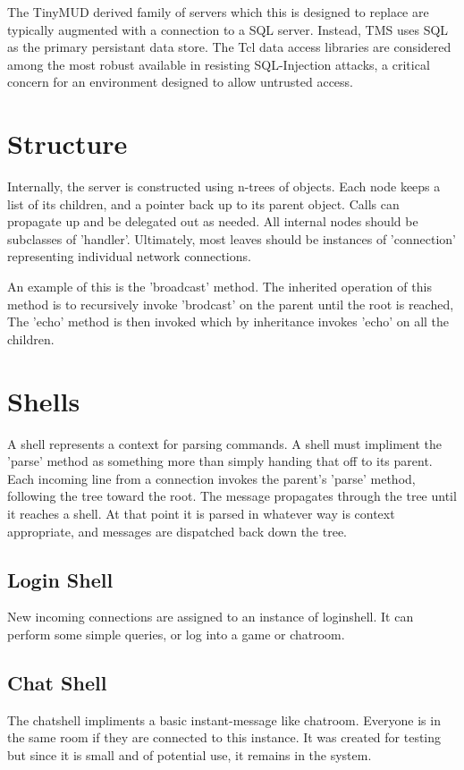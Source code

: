 \documentclass[10pt,letterpaper,twoside]{book}
\begin{document}
The TinyMUD derived family of servers which this is designed to replace are typically augmented with a connection to a SQL server.
Instead, TMS uses SQL as the primary persistant data store.
The Tcl data access libraries are considered among the most robust available in resisting SQL-Injection attacks,
a critical concern for an environment designed to allow untrusted access.
\chapter{Structure}
Internally, the server is constructed using n-trees of objects.
Each node keeps a list of its children, and a pointer back up to its parent object.
Calls can propagate up and be delegated out as needed.
All internal nodes should be subclasses of 'handler'.
Ultimately, most leaves should be instances of 'connection' representing individual network connections.

An example of this is the 'broadcast' method.
The inherited operation of this method is to recursively invoke 'brodcast' on the parent until the root is reached,
The 'echo' method is then invoked which by inheritance invokes 'echo' on all the children.
\chapter{Shells}
A shell represents a context for parsing commands.
A shell must impliment the 'parse' method as something more than simply handing that off to its parent.
Each incoming line from a connection invokes the parent's 'parse' method, following the tree toward the root.
The message propagates through the tree until it reaches a shell.
At that point it is parsed in whatever way is context appropriate, and messages are dispatched back down the tree.
\section{Login Shell}
New incoming connections are assigned to an instance of loginshell.
It can perform some simple queries, or log into a game or chatroom.
\section{Chat Shell}
The chatshell impliments a basic instant-message like chatroom.
Everyone is in the same room if they are connected to this instance.
It was created for testing but since it is small and of potential use, it remains in the system.
\end{document}
